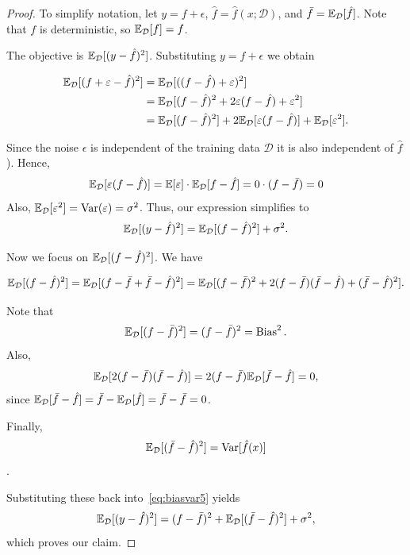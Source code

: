 \begin{proof}
To simplify notation, let $y = f + \epsilon$, $\hat{f} = \hat{f}(x; \mathcal{D})$, and $\bar{f} = \mathbb{E}_\mathcal{D}[\hat{f}]$. Note that $f$ is deterministic, so $\mathbb{E}_\mathcal{D}[f] = f$.

The objective is $\mathbb{E}_\mathcal{D}[(y - \hat{f})^2]$. Substituting $y = f + \epsilon$ we obtain

\begin{align*}
\mathbb{E}_\mathcal{D}[(f + \varepsilon - \hat{f})^2] & = \mathbb{E}_\mathcal{D}[((f - \hat{f}) + \varepsilon)^2] \\
& = \mathbb{E}_\mathcal{D}[(f - \hat{f})^2 + 2\varepsilon(f - \hat{f}) + \varepsilon^2] \\
& = \mathbb{E}_\mathcal{D}[(f - \hat{f})^2] + 2\mathbb{E}_\mathcal{D}[\varepsilon(f - \hat{f})] + \mathbb{E}_\mathcal{D}[\varepsilon^2].
\end{align*}

Since the noise $\epsilon$ is independent of the training data $\mathcal{D}$ it is also independent of $\hat{f}$). Hence,
$$\mathbb{E}_\mathcal{D}[\varepsilon(f - \hat{f})] = \mathbb{E}[\varepsilon] \cdot \mathbb{E}_\mathcal{D}[f - \hat{f}] = 0 \cdot (f - \bar{f}) = 0$$
Also, $\mathbb{E}_\mathcal{D}[\varepsilon^2] = \operatorname{Var}(\varepsilon) = \sigma^2$. Thus, our expression simplifies to
\begin{equation}\label{eq:biasvar5}
\mathbb{E}_\mathcal{D}[(y - \hat{f})^2] = \mathbb{E}_\mathcal{D}[(f - \hat{f})^2] + \sigma^2.
\end{equation}


Now we focus on $\mathbb{E}_\mathcal{D}[(f - \hat{f})^2]$. We have 

$$\mathbb{E}_\mathcal{D}[(f - \hat{f})^2] = \mathbb{E}_\mathcal{D}[(f - \bar{f} + \bar{f} - \hat{f})^2]= \mathbb{E}_\mathcal{D}[(f - \bar{f})^2 + 2(f - \bar{f})(\bar{f} - \hat{f}) + (\bar{f} - \hat{f})^2].$$

Note that 
$$\mathbb{E}_\mathcal{D}[(f - \bar{f})^2] = (f - \bar{f})^2 = \operatorname{Bias}^2.$$
Also, 
$$\mathbb{E}_\mathcal{D}[2(f - \bar{f})(\bar{f} - \hat{f})] = 2(f - \bar{f}) \mathbb{E}_\mathcal{D}[\bar{f} - \hat{f}] = 0,$$ 
since $\mathbb{E}_\mathcal{D}[\bar{f} - \hat{f}] = \bar{f} - \mathbb{E}_\mathcal{D}[\hat{f}] = \bar{f} - \bar{f} = 0$.

Finally, 
$$\mathbb{E}_\mathcal{D}[(\bar{f} - \hat{f})^2] = \operatorname{Var} [\hat{f}(x)]$$.

Substituting these back into~\eqref{eq:biasvar5} yields
$$\mathbb{E}_\mathcal{D}[(y - \hat{f})^2] = (f - \bar{f})^2 + \mathbb{E}_\mathcal{D}[(\bar{f} - \hat{f})^2] + \sigma^2,$$
which proves our claim.
\end{proof}



